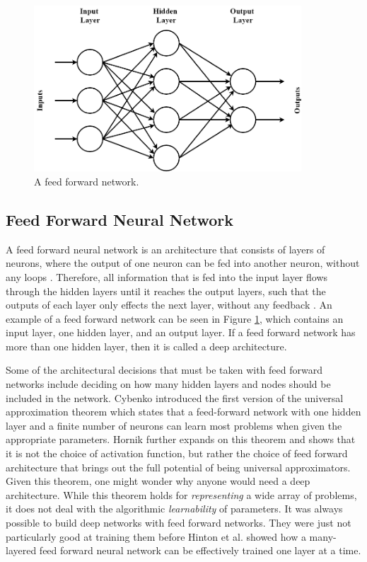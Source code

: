 \documentclass{UoYCSproject}
\begin{document}
\begin{figure}[h]
\includegraphics[width=10cm]{feedforward.png}
\centering
\caption{A feed forward network.} 
\label{fig:feedforward}
\end{figure}

\subsection{Feed Forward Neural Network}
A feed forward neural network is an architecture that consists of layers of neurons, where the output of one neuron can be fed into another neuron, without any loops \cite{jain1996artificial}. Therefore, all information that is fed into the input layer flows through the hidden layers until it reaches the output layers, such that the outputs of each layer only effects the next layer, without any feedback \cite{jhaartificial}. An example of a feed forward network can be seen in Figure \ref{fig:feedforward}, which contains an input layer, one hidden layer, and an output layer. If a feed forward network has more than one hidden layer, then it is called a deep architecture. 

Some of the architectural decisions that must be taken with feed forward networks include deciding on how many hidden layers and nodes should be included in the network. Cybenko \cite{cybenko1989approximation} introduced the first version of the universal approximation theorem which states that a feed-forward network with one hidden layer and a finite number of neurons can learn most problems when given the appropriate parameters. Hornik \cite{hornik1991approximation} further expands on this theorem and shows that it is not the choice of activation function, but rather the choice of feed forward architecture that brings out the full potential of being universal approximators. Given this theorem, one might wonder why anyone would need a deep architecture. While this theorem holds for \textit{representing} a wide array of problems, it does not deal with the algorithmic \textit{learnability} of parameters. It was always possible to build deep networks with feed forward networks. They were just not particularly good at training them before Hinton et al. \cite{hinton2006fast} showed how a many-layered feed forward neural network can be effectively trained one layer at a time. 
\end{document}
